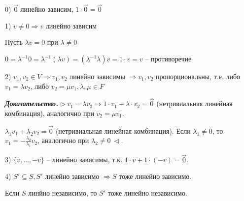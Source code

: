 0) $\overrightarrow{0}$ линейно зависим, $1 \cdot \overrightarrow{0} = \overrightarrow{0}$

1) $v \neq 0 \Rightarrow v$ линейно зависим

Пусть $\lambda v = 0$ при $\lambda \neq 0$

$0 = \lambda^{-1} 0 = \lambda^{-1} (\lambda v) = (\lambda^{-1} \lambda) v = 1 \cdot v = v$ -- противоречие

2) $v_1, v_2 \in V \Rightarrow v_1, v_2$ линейно зависимы $\Rightarrow v_1, v_2$ пропорциональны, т.е. либо $v_1 = \lambda v_2$, либо $v_2 = \mu v_1, \lambda, \mu \in F$

\textbf{\textit{Доказательство.}} $\rhd \ v_1 = \lambda v_2 \Rightarrow 1 \cdot v_1 - \lambda \cdot v_2 = \overrightarrow{0}$ (нетривиальная линейная комбинация), аналогично при $v_2 = \mu v_1$.

$\lambda_1 v_1 + \lambda_2 v_2 = \overrightarrow{0}$ (нетривиальная линейная комбинация). Если $\lambda_1 \neq 0$, то $v_1 = -\frac{\lambda_2}{\lambda_1} v_2$, аналогично при $\lambda_2 \neq 0 \ \lhd$.

\vspace{\baselineskip}
3) $\{v, \dots, -v\}$ -- линейно зависимы, т.к. $1 \cdot v + 1 \cdot (-v) = \overrightarrow{0}$.

4) $S' \subseteq S, S'$ линейно зависимо $\Rightarrow S$ тоже линейно зависимо.

Если $S$ линйно независимо, то $S'$ тоже линейно независимо.

